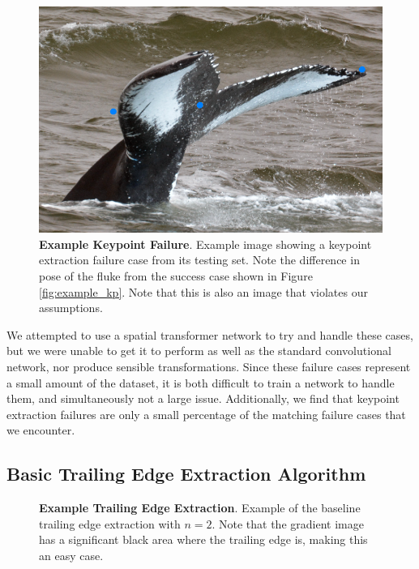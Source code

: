 \begin{figure}[t]%
\centering
\includegraphics[width=1.0\textwidth]{../images/aid1323_kpoverlay.png}
\caption[]{\textbf{Example Keypoint Failure}. Example image showing a keypoint extraction failure case from its testing set. Note the difference in pose of the fluke from the success case shown in Figure \ref{fig:example_kp}. Note that this is also an image that violates our assumptions.}
\label{fig:example_kp_failure}
\end{figure}



We attempted to use a spatial transformer network \cite{jaderberg2015spatial} to try and handle these cases, but we were unable to get it to perform as well as the standard convolutional network, nor produce sensible transformations.
Since these failure cases represent a small amount of the dataset, it is both difficult to train a network to handle them, and simultaneously not a large issue.
Additionally, we find that keypoint extraction failures are only a small percentage of the matching failure cases that we encounter.

\subsection{Basic Trailing Edge Extraction Algorithm}


\begin{figure}[t]%
\centering
{}
\newline
{}
\caption[]{\textbf{Example Trailing Edge Extraction}. Example of the baseline trailing edge extraction with $n = 2$. Note that the gradient image has a significant black area where the trailing edge is, making this an easy case.}
\label{fig:example_te_extract_noscorer}
\end{figure}

